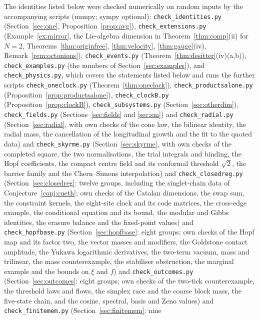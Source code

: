 \documentclass[aps,pra,onecolumn,superscriptaddress,nofootinbib,10pt]{revtex4-2}
\theoremstyle{definition}
\theoremstyle{remark}
\begin{document}
{\sloppy The identities listed below were checked numerically on random inputs by the accompanying
scripts (numpy; sympy optional): \texttt{check\_identities.py} (Section~\ref{sec:one}, Proposition~\ref{prop:avg}),
\texttt{check\_extensions.py} (Example~\ref{ex:mirror}, the Lie-algebra dimension in
Theorem~\ref{thm:comp}(ii) for $N=2$, Theorems~\ref{thm:originfree}, \ref{thm:velocity},
\ref{thm:gauge}(iv), Remark~\ref{rem:octonions}), \texttt{check\_events.py}
(Theorem~\ref{thm:desitter}(iv)(a,b)), \texttt{check\_examples.py} (the numbers of Section~\ref{sec:examples}),
and \texttt{check\_physics.py}, which covers the statements listed below and runs the further scripts
\texttt{check\_oneclock.py} (Theorem~\ref{thm:oneclock}), \texttt{check\_productsalone.py}
(Proposition~\ref{prop:productsalone}), \texttt{check\_clockB.py} (Proposition~\ref{prop:clockB}),
\texttt{check\_subsystems.py} (Section~\ref{sec:otherdim}), \texttt{check\_fields.py} (Sections~\ref{sec:fields}
and \ref{sec:sm}) and \texttt{check\_radial.py} (Section~\ref{sec:radial}, with own checks of the cone law, the
bilinear identity, the radial mass, the cancellation of the longitudinal growth and the fit to the
quoted data) and \texttt{check\_skyrme.py} (Section~\ref{sec:skyrme}, with own checks of the completed square, the
two normalisations, the trial integrals and binding, the Hopf coefficients, the compact centre field and
its conformal threshold $\sqrt2$, the barrier family and the Chern--Simons interpolation) and \texttt{check\_closedreg.py}
(Section~\ref{sec:closedreg}: twelve groups, including the singlet-chain data of Conjecture~\ref{conj:cueth}; own checks of the
Catalan dimensions, the swap sum, the constraint kernels, the eight-site clock and its code matrices, the
cross-edge example, the conditional equation and its bound, the modular and Gibbs identities, the
erasure balance and the fixed-point values) and \texttt{check\_hopfbase.py} (Section~\ref{sec:hopfbase}: eight groups;
own checks of the Hopf map and its factor two, the vector masses and modifiers, the Goldstone contact
amplitude, the Yukawa logarithmic derivatives, the two-term vacuum, mass and trilinear, the mass
counterexample, the stabiliser obstruction, the marginal example and the bounds on $\xi$ and $f$) and
\texttt{check\_outcomes.py} (Section~\ref{sec:outcomes}: eight groups; own checks of the two-tick counterexample,
the threshold laws and flows, the simplex race and the coarse block mass, the five-state chain, and
the cosine, spectral, basis and Zeno values) and \texttt{check\_finitemem.py} (Section~\ref{sec:finitemem}: nine
}
\end{document}
